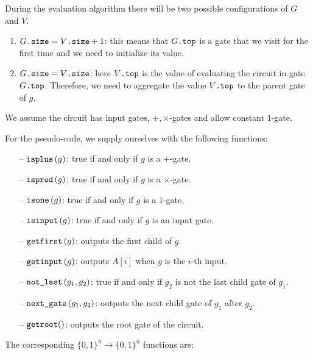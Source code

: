 During the evaluation algorithm there will be two possible configurations of $G$ and $V$.

\begin{enumerate}
	\item $G\texttt{.size} = V\texttt{.size} + 1$: this means that $G\texttt{.top}$ is a gate that we visit for the first time and we need to initialize its value.
	
	\item $G\texttt{.size} = V\texttt{.size}$: here $V\texttt{.top}$ is the value of evaluating the circuit in gate $G\texttt{.top}$. Therefore, we need to aggregate the value $V\texttt{.top}$ to the parent gate of $g$.
\end{enumerate}

We assume the circuit has input gates, $+, \times$-gates and allow constant $1$-gate.

For the pseudo-code, we supply ourselves with the following functions:

\begin{itemize}
	\item[--] $\texttt{isplus}\left( g \right)$: true if and only if $g$ is a $+$-gate.
	\item[--] $\texttt{isprod}\left(g \right)$: true if and only if $g$ is a $\times$-gate.
	\item[--] $\texttt{isone}\left(g \right)$: true if and only if $g$ is a $1$-gate.
	\item[--] $\texttt{isinput}\left(g \right)$: true if and only if $g$ is an input gate.
	\item[--] $\texttt{getfirst}\left(g \right)$: outputs the first child of $g$.
	\item[--] $\texttt{getinput}\left(g \right)$: outputs $A[i]$ when $g$ is the $i$-th input.
	\item[--] $\texttt{not{\_}last}\left(g_1,g_2 \right)$: true if and only if $g_2$ is not the last child gate of $g_1$.
	\item[--] $\texttt{next{\_}gate}\left(g_1, g_2 \right)$: outputs the next child gate of $g_1$ after $g_2$.
	\item[--] $\texttt{getroot}()$: outputs the root gate of the circuit.
\end{itemize}

The corresponding $\lbrace 0,1 \rbrace^n\rightarrow\lbrace 0,1 \rbrace^n$ functions are:

